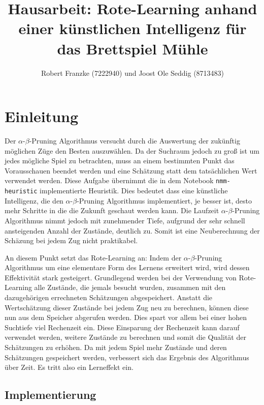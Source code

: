 \documentclass[11pt]{article}
\title{Hausarbeit: Rote-Learning anhand einer künstlichen Intelligenz für das Brettspiel Mühle}
\author{Robert Franzke (7222940) und Joost Ole Seddig (8713483)}
\date{}
\begin{document}
    
    \maketitle
    
    

    
    \hypertarget{rote-learning}{%
\section{Einleitung}\label{rote-learning}}


    Der $\alpha$-$\beta$-Pruning Algorithmus versucht durch die Auswertung der zukünftig
möglichen Züge den Besten auszuwählen. Da der Suchraum jedoch zu groß
ist um jedes mögliche Spiel zu betrachten, muss an einem bestimmten
Punkt das Vorausschauen beendet werden und eine Schätzung statt dem
tatsächlichen Wert verwendet werden. Diese Aufgabe übernimmt die in dem
Notebook \texttt{nmm-heuristic} implementierte Heuristik. Dies bedeutet
dass eine künstliche Intelligenz, die den $\alpha$-$\beta$-Pruning Algorithmus
implementiert, je besser ist, desto mehr Schritte in die die Zukunft
geschaut werden kann. Die Laufzeit $\alpha$-$\beta$-Pruning Algorithmus nimmt jedoch
mit zunehmender Tiefe, aufgrund der sehr schnell ansteigenden Anzahl der
Zustände, deutlich zu. Somit ist eine Neuberechnung der Schäzung bei
jedem Zug nicht praktikabel.

An diesem Punkt setzt das Rote-Learning an: Indem der $\alpha$-$\beta$-Pruning
Algorithmus um eine elementare Form des Lernens erweitert wird, wird
dessen Effektivität stark gesteigert. Grundlegend werden bei der
Verwendung von Rote-Learning alle Zustände, die jemals besucht wurden,
zusammen mit den dazugehörigen errechneten Schätzungen abgespeichert.
Anstatt die Wertschätzung dieser Zustände bei jedem Zug neu zu
berechnen, können diese nun aus dem Speicher abgerufen werden. Dies
spart vor allem bei einer hohen Suchtiefe viel Rechenzeit ein. Diese
Einsparung der Rechenzeit kann darauf verwendet werden, weitere Zustände
zu berechnen und somit die Qualität der Schätzungen zu erhöhen. Da mit
jedem Spiel mehr Zustände und deren Schätzungen gespeichert werden,
verbessert sich das Ergebnis des Algorithmus über Zeit. Es tritt also
ein Lerneffekt ein.

    \hypertarget{implementierung}{%
\subsection{Implementierung}\label{implementierung}}
\end{document}
